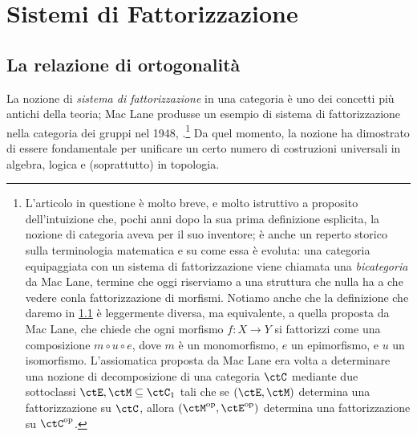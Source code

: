 \label{cap:fattorizzazione}
\chapter{Sistemi di Fattorizzazione}
\section{La relazione di ortogonalità}
La nozione di \emph{sistema di fattorizzazione} in una categoria è uno dei concetti più antichi della teoria; Mac Lane produsse un esempio di sistema di fattorizzazione nella categoria dei gruppi nel 1948, \cite{maclane_grp_duality}.\footnote{L'articolo in questione è molto breve, e molto istruttivo a proposito dell'intuizione che, pochi anni dopo la sua prima definizione esplicita, la nozione di categoria aveva per il suo inventore; è anche un reperto storico sulla terminologia matematica e su come essa è evoluta: una categoria equipaggiata con un sistema di fattorizzazione viene chiamata una \emph{bicategoria} da Mac Lane, termine che oggi riserviamo a una struttura che nulla ha a che vedere conla fattorizzazione di morfismi. Notiamo anche che la definizione che daremo in \ref{} è leggermente diversa, ma equivalente, a quella proposta da Mac Lane, che chiede che ogni morfismo $f : X\to Y$ si fattorizzi come una composizione $m\circ u\circ e$, dove $m$ è un monomorfismo, $e$ un epimorfismo, e $u$ un isomorfismo. L'assiomatica proposta da Mac Lane era volta a determinare una nozione di decomposizione di una categoria $\ctC$ mediante due sottoclassi $\ctE,\ctM\subseteq\ctC_1$ tali che se $(\ctE,\ctM)$ determina una fattorizzazione su $\ctC$, allora $(\ctM^\op,\ctE^\op)$ determina una fattorizzazione su $\ctC^\op$.} Da quel momento, la nozione ha dimostrato di essere fondamentale per unificare un certo numero di costruzioni universali in algebra, logica e (soprattutto) in topologia.

